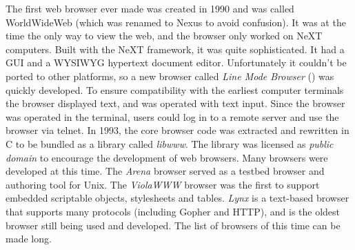 
    The first \gls{web} \gls{browser} ever made was created in 1990 and was called WorldWideWeb (which was renamed to Nexus to avoid confusion).
    It was at the time the only way to view the \gls{web}, and the \gls{browser} only worked on NeXT computers.
    Built with the NeXT framework, it was quite sophisticated.
    It had a \gls{GUI} and a \gls{WYSIWYG} \gls{hypertext} \gls{document} editor.
    Unfortunately it couldn't be ported to other platforms, so a new \gls{browser} called \emph{Line Mode Browser} () was quickly developed.
    To ensure compatibility with the earliest computer terminals the \gls{browser} displayed text, and was operated with text input.
    Since the \gls{browser} was operated in the terminal, users could log in to a remote server and use the \gls{browser} via telnet.
    In 1993, the core browser code was extracted and rewritten in C to be bundled as a library called \emph{libwww}.
    The library was licensed as \emph{public domain} to encourage the development of \gls{web} \glspl{browser}.
    Many \glspl{browser} were developed at this time.
    The \emph{Arena} \gls{browser} served as a testbed \gls{browser} and authoring tool for Unix.
    The \emph{ViolaWWW} \gls{browser} was the first to support embedded scriptable objects, stylesheets and tables.
    \emph{Lynx} is a text-based \gls{browser} that supports many protocols (including Gopher and \gls{HTTP}), and is the oldest \gls{browser} still being used and developed.
    The list of \glspl{browser} of this time can be made long.

